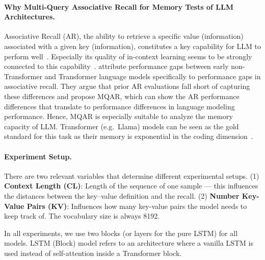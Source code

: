 \documentclass[dvipsnames]{article}
\begin{document}
\begin{appendix}
\paragraph{Why Multi-Query Associative Recall for Memory Tests of LLM Architectures.}
Associative Recall (AR), the ability to retrieve a specific value (information) associated with a given key (information), constitutes a key capability for LLM to perform well~\citep{Poli:24arxiv, Arora:23arxiv, Olsson:22short}.
Especially its quality of in-context learning seems to be strongly connected to this capability~\citep{Olsson:22short}.
\citet{Arora:23arxiv} attribute performance gaps between early non-Transformer and Transformer language models specifically to performance gaps in associative recall.
They argue that prior AR evaluations fall short of capturing these differences and propose MQAR, 
which can show the AR performance differences that translate to performance differences in language modeling performance.
Hence, MQAR is especially suitable to analyze the memory capacity of LLM. 
Transformer (e.g.\ Llama) models can be seen as the gold standard for this task as their memory 
is exponential in the coding dimension~\citep{Ramsauer:21}.


\paragraph{Experiment Setup.}
There are two relevant variables that determine 
different experimental setups. 
(1) \textbf{Context Length (CL)}: Length of the sequence of 
one sample --- this influences the distances between the key--value 
definition and the recall. 
(2) \textbf{Number Key-Value Pairs (KV)}: Influences how many key-value 
pairs the model needs to keep track of. The vocabulary size is always 8192. 

In all experiments, we use two blocks (or layers for the pure LSTM) for all models.
LSTM (Block) model refers to an architecture 
where a vanilla LSTM is used instead of self-attention inside a Transformer block.


\end{appendix}
\end{document}
